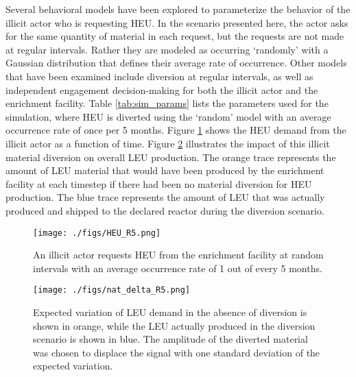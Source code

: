 Several behavioral models have been explored to parameterize the behavior of the illicit actor who is requesting \gls{HEU}.   In the scenario presented here, the actor asks for the same quantity of material in each request, but the requests are not made at regular intervals. Rather they are modeled as occurring `randomly' with a Gaussian distribution that defines their average rate of occurrence.  Other models that have been examined include diversion at regular intervals, as well as independent engagement decision-making for both the illicit actor and the enrichment facility.  Table \ref{tab:sim_params} lists the parameters used for the simulation, where \gls{HEU} is diverted using the `random' model with an average occurrence rate of once per 5 months.  Figure \ref{fig:heu_demand} shows the \gls{HEU} demand from the illicit actor as a function of time.  Figure \ref{fig:leu_produced} illustrates the impact of this illicit material diversion on overall \gls{LEU} production.  The orange trace represents the amount of \gls{LEU} material that would have been produced by the enrichment facility at each timestep if there had been no material diversion for \gls{HEU} production.  The blue trace represents the amount of \gls{LEU} that was actually produced and shipped to the declared reactor during the diversion scenario.


\begin{figure}
\begin{center}
\texttt{[image: ./figs/HEU\_R5.png]}
\end{center}
\caption{An illicit actor requests \gls{HEU} from the enrichment facility at random intervals with an average occurrence rate of 1 out of every 5 months.}
\label{fig:heu_demand}
\end{figure}

\begin{figure}
\begin{center}
\texttt{[image: ./figs/nat\_delta\_R5.png]}
\end{center}
\caption{Expected variation of \gls{LEU} demand in the absence of diversion is shown in orange, while the \gls{LEU} actually produced in the diversion scenario is shown in blue. The amplitude of the diverted material was chosen to displace the signal with one standard deviation of the expected variation.}
\label{fig:leu_produced}
\end{figure}



